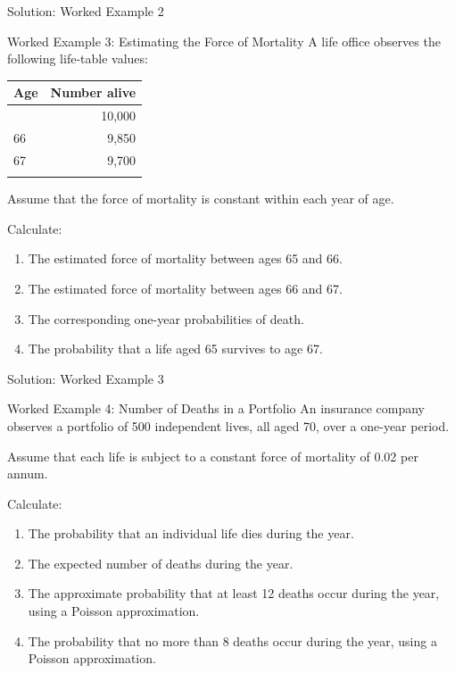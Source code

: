 \documentclass[
  ignorenonframetext,
  aspectratio=169,
]{beamer}
\newcounter{none} %
\providecommand{\tightlist}{%
  \setlength{\itemsep}{0pt}\setlength{\parskip}{0pt}}
\begin{document}
\begin{frame}{Solution: Worked Example 2}
\protect{}\label{solution-worked-example-2}
\end{frame}

\begin{frame}{Worked Example 3: Estimating the Force of Mortality}
\protect{}\label{worked-example-3-estimating-the-force-of-mortality}
A life office observes the following life-table values:

{\def\LTcaptype{none} %
\begin{longtable}[]{@{}lr@{}}
\toprule\noalign{}
Age & Number alive \\
\midrule\noalign{}
\endhead
65 & 10,000 \\
66 & 9,850 \\
67 & 9,700 \\
\bottomrule\noalign{}
\end{longtable}
}

Assume that the force of mortality is constant within each year of age.

Calculate:

\begin{enumerate}
\tightlist
\item
  The estimated force of mortality between ages 65 and 66.
\item
  The estimated force of mortality between ages 66 and 67.
\item
  The corresponding one-year probabilities of death.
\item
  The probability that a life aged 65 survives to age 67.
\end{enumerate}
\end{frame}

\begin{frame}{Solution: Worked Example 3}
\protect{}\label{solution-worked-example-3}
\end{frame}

\begin{frame}{Worked Example 4: Number of Deaths in a Portfolio}
\protect{}\label{worked-example-4-number-of-deaths-in-a-portfolio}
An insurance company observes a portfolio of 500 independent lives, all
aged 70, over a one-year period.

Assume that each life is subject to a constant force of mortality of
0.02 per annum.

Calculate:

\begin{enumerate}
\tightlist
\item
  The probability that an individual life dies during the year.
\item
  The expected number of deaths during the year.
\item
  The approximate probability that at least 12 deaths occur during the
  year, using a Poisson approximation.
\item
  The probability that no more than 8 deaths occur during the year,
  using a Poisson approximation.
\end{enumerate}
\end{frame}
\end{document}
